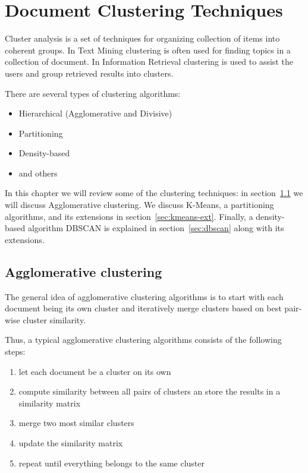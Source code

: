 \section{Document Clustering Techniques} \label{sec:doc-clustering}

Cluster analysis is a set of techniques for
organizing collection of items into coherent groups.
In Text Mining clustering is often used for finding topics
in a collection of document.
In Information Retrieval clustering is used to assist the users and group
retrieved results into clusters.


There are several types of clustering algorithms:

\begin{itemize}
\itemsep1pt\parskip0pt
  \item Hierarchical (Agglomerative and Divisive)
  \item Partitioning
  \item Density-based
  \item and others
\end{itemize}

In this chapter we will review some of the clustering techniques:
in section~\ref{sec:clustering-heierarchical} we will discuss
Agglomerative clustering. We discuss K-Means, a partitioning algorithms,
and its extensions in section~\ref{sec:kmeans-ext}.
Finally, a density-based algorithm DBSCAN is explained in
section~\ref{sec:dbscan} along with its extensions.


\subsection{Agglomerative clustering} \label{sec:clustering-heierarchical}

The general idea of agglomerative clustering algorithms is to start with
each document being its own cluster and iteratively merge clusters based
on best pair-wise cluster similarity.

Thus, a typical agglomerative clustering algorithms consists of the following steps:

\begin{enumerate}
\itemsep1pt\parskip0pt
  \item let each document be a cluster on its own
  \item compute similarity between all pairs of clusters an store the
      results in a similarity matrix
  \item merge two most similar clusters
  \item update the similarity matrix
  \item repeat until everything belongs to the same cluster
\end{enumerate}

